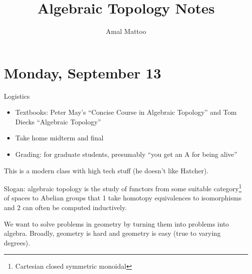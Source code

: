 \documentclass[12pt]{article}
\title{Algebraic Topology Notes}
\author{Amal Mattoo}
\theoremstyle{definition}
\begin{document}
	\maketitle 
	\section{Monday, September 13}
	Logistics 
	\begin{itemize}
		\item Textbooks: Peter May's ``Concise Course in Algebraic Topology'' and Tom Diecks ``Algebraic Topology''
		\item Take home midterm and final
		\item Grading: for graduate students, presumably ``you get an A for being alive'' 
	\end{itemize}
	This is a modern class with high tech stuff (he doesn't like Hatcher). 
	
	Slogan: algebraic topology is the study of functors from some suitable category\footnote{Cartesian closed symmetric monoidal} of spaces to Abelian groups that 1 take homotopy equivalences to isomorphisms and 2 can often be computed inductively. 
	
	We want to solve problems in geometry by turning them into problems into algebra. Broadly, geometry is hard and geometry is easy (true to varying degrees).
	
\end{document}
